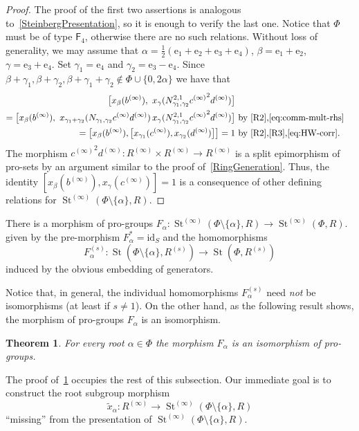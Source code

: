 \documentclass[oneside, 11pt]{amsart}
\numberwithin{equation}{section}
\newtheorem{theorem}{Theorem}
\theoremstyle{definition}
\theoremstyle{remark}
\DeclareMathOperator\St{St}
\newcommand{\rF}{\mathsf{F}}
\begin{document}
\begin{proof}
The proof of the first two assertions is analogous to~\cref{SteinbergPresentation}, so it is enough to verify the last one. Notice that \(\Phi\) must be of type $\rF_4$, otherwise there are no such relations. Without loss of generality, we may assume that \(\alpha = \frac{1}{2}(\mathrm e_1 + \mathrm e_2 + \mathrm e_3 + \mathrm e_4)\), \(\beta = \mathrm e_1 + \mathrm e_2\), \(\gamma = \mathrm e_3 + \mathrm e_4\). Set \(\gamma_1 = \mathrm e_4\) and \(\gamma_2 = \mathrm e_3 - \mathrm e_4\). Since \(\beta + \gamma_1, \beta + \gamma_2, \beta + \gamma_1 + \gamma_2 \notin \Phi \cup \{0, 2\alpha\}\) we have that
\begin{align*}
\bigl[x_\beta(b^{(\infty)}),\ x_\gamma(N_{\gamma_1, \gamma_2}^{2, 1} {c^{(\infty)}}^2 d^{(\infty)})\bigr] \\ = \bigl[x_\beta(b^{(\infty)}),\ x_{\gamma_1 + \gamma_2}(N_{\gamma_1, \gamma_2} c^{(\infty)} d^{(\infty)})\, x_\gamma(N_{\gamma_1, \gamma_2}^{2, 1} {c^{(\infty)}}^2 d^{(\infty)})\bigr] & \text{ by~\eqref{R2},\eqref{eq:comm-mult-rhs}}\\
= \bigl[x_\beta(b^{(\infty)}), \bigl[x_{\gamma_1}(c^{(\infty)}), x_{\gamma_2}(d^{(\infty)})\bigr]\bigr] = 1 &\text{ by~\eqref{R2},\eqref{R3},\eqref{eq:HW-corr}}.
\end{align*}
The morphism ${c^{(\infty)}}^2 d^{(\infty)} \colon R^{(\infty)} \times R^{(\infty)} \to R^{(\infty)}$ is a split epimorphism of pro-sets by an argument similar to the proof of~\cref{RingGeneration}. Thus, the identity \([x_\beta(b^{(\infty)}), x_\gamma(c^{(\infty)})] = 1\) is a consequence of other defining relations for $\St^{(\infty)}(\Phi\setminus\{\alpha\}, R)$.
\end{proof}

There is a morphism of pro-groups
$F_\alpha \colon \St^{(\infty)}(\Phi \setminus\{\alpha\}, R) \to \St^{(\infty)}(\Phi, R).$
given by the pre-morphism $F_\alpha^{*} = \mathrm{id}_S$ and the homomorphisms \[F_\alpha^{(s)} \colon \St(\Phi \setminus\{\alpha\}, R^{(s)}) \to \St(\Phi, R^{(s)})\] induced by the obvious embedding of generators.

Notice that, in general, the individual homomorphisms $F_\alpha^{(s)}$ need {\it not} be isomorphisms (at least if $s \neq 1$). On the other hand, as the following result shows, the morphism of pro-groups $F_\alpha$ is an isomorphism. 
\begin{theorem}\label{SingleRootElimination} For every root \(\alpha \in \Phi\) the morphism $F_\alpha$ is an isomorphism of pro-groups. \end{theorem}
The proof of~\cref{SingleRootElimination} occupies the rest of this subsection.
Our immediate goal is to construct the root subgroup morphism
\[\widetilde x_{ \alpha} \colon R^{(\infty)} \to \St^{(\infty)}(\Phi \setminus \{ \alpha\}, R) \] ``missing'' from the presentation of $\St^{(\infty)}(\Phi\setminus\{\alpha\}, R)$. %
\end{document}
